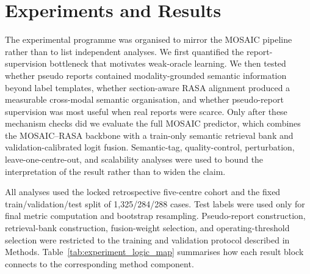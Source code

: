 
\section{Experiments and Results}
\label{sec:experiments_results}

The experimental programme was organised to mirror the MOSAIC pipeline rather than to list independent analyses. We first quantified the report-supervision bottleneck that motivates weak-oracle learning. We then tested whether pseudo reports contained modality-grounded semantic information beyond label templates, whether section-aware RASA alignment produced a measurable cross-modal semantic organisation, and whether pseudo-report supervision was most useful when real reports were scarce. Only after these mechanism checks did we evaluate the full MOSAIC predictor, which combines the MOSAIC--RASA backbone with a train-only semantic retrieval bank and validation-calibrated logit fusion. Semantic-tag, quality-control, perturbation, leave-one-centre-out, and scalability analyses were used to bound the interpretation of the result rather than to widen the claim.

All analyses used the locked retrospective five-centre cohort and the fixed train/validation/test split of 1,325/284/288 cases. Test labels were used only for final metric computation and bootstrap resampling. Pseudo-report construction, retrieval-bank construction, fusion-weight selection, and operating-threshold selection were restricted to the training and validation protocol described in Methods. Table~\ref{tab:experiment_logic_map} summarises how each result block connects to the corresponding method component.

